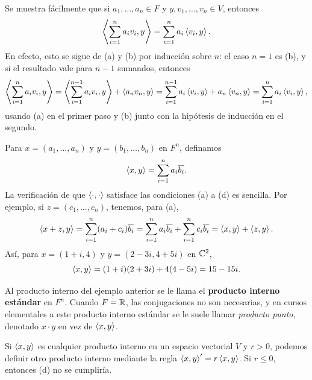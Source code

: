 \documentclass[12pt,a4paper]{book}
\begin{document}
    Se muestra fácilmente que si $a_1,\dots,a_n\in F$ y $y,v_1,\dots,v_n\in V$, entonces
    \begin{equation*}
        \left\langle \sum_{i=1}^{n}a_iv_i, y \right\rangle=\sum_{i=1}^{n}a_i\left\langle v_i, y \right\rangle.
    \end{equation*}
    En efecto, esto se sigue de (a) y (b) por inducción sobre $n$: el caso $n=1$ es (b), y si el resultado vale para $n-1$ sumandos, entonces
    \begin{equation*}
        \left\langle \sum_{i=1}^{n}a_iv_i, y \right\rangle=\left\langle \sum_{i=1}^{n-1}a_iv_i, y \right\rangle+\left\langle a_nv_n, y \right\rangle=\sum_{i=1}^{n-1}a_i\left\langle v_i, y \right\rangle+a_n\left\langle v_n, y \right\rangle=\sum_{i=1}^{n}a_i\left\langle v_i, y \right\rangle,
    \end{equation*}
    usando (a) en el primer paso y (b) junto con la hipótesis de inducción en el segundo.

    \begin{ejemplo}
        Para $x=(a_1,\dots,a_n)$ y $y=(b_1,\dots,b_n)$ en $F^n$, definamos
        \begin{equation*}
            \left\langle x, y \right\rangle=\sum_{i=1}^{n}a_i\overline{b_i}.
        \end{equation*}
        La verificación de que $\left\langle \cdot, \cdot \right\rangle$ satisface las condiciones (a) a (d) es sencilla. Por ejemplo, si $z=(c_1,\dots,c_n)$, tenemos, para (a),
        \begin{align*}
            \left\langle x+z, y \right\rangle=\sum_{i=1}^{n}(a_i+c_i)\overline{b_i}=\sum_{i=1}^{n}a_i\overline{b_i}+\sum_{i=1}^{n}c_i\overline{b_i}=\left\langle x, y \right\rangle+\left\langle z, y \right\rangle.
        \end{align*}
        Así, para $x=(1+i,4)$ y $y=(2-3i,4+5i)$ en $\mathbb{C}^2$,
        \begin{equation*}
            \left\langle x, y \right\rangle=(1+i)(2+3i)+4(4-5i)=15-15i.
        \end{equation*}
    \end{ejemplo}

    Al producto interno del ejemplo anterior se le llama el \textbf{producto interno estándar} en $F^n$. Cuando $F=\mathbb{R}$, las conjugaciones no son necesarias, y en cursos elementales a este producto interno estándar se le suele llamar \textit{producto punto}, denotado $x\cdot y$ en vez de $\left\langle x, y \right\rangle$.

    \begin{ejemplo}
        Si $\left\langle x, y \right\rangle$ es cualquier producto interno en un espacio vectorial $V$ y $r>0$, podemos definir otro producto interno mediante la regla $\left\langle x, y \right\rangle'=r\left\langle x, y \right\rangle$. Si $r\leq 0$, entonces (d) no se cumpliría.
    \end{ejemplo}
\end{document}
